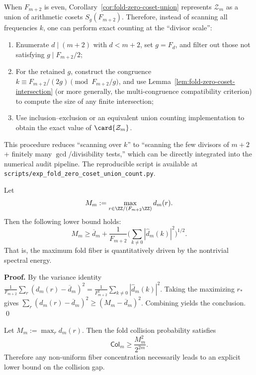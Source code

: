 \begin{remark}\label{rem:fold-zero-coset-algorithm}
When \(F_{m+2}\) is even, Corollary~\ref{cor:fold-zero-coset-union} represents \(\mathcal{Z}_m\) as a union of arithmetic cosets \(S_g(F_{m+2})\).
Therefore, instead of scanning all frequencies \(k\), one can perform exact counting at the ``divisor scale'':
\begin{enumerate}
  \item Enumerate \(d\mid(m+2)\) with \(d<m+2\), set \(g=F_d\), and filter out those not satisfying \(g\mid F_{m+2}/2\);
  \item For the retained \(g\), construct the congruence \(k\equiv F_{m+2}/(2g)\pmod{F_{m+2}/g}\), and use Lemma~\ref{lem:fold-zero-coset-intersection} (or more generally, the multi-congruence compatibility criterion) to compute the size of any finite intersection;
  \item Use inclusion--exclusion or an equivalent union counting implementation to obtain the exact value of \(\card{\mathcal{Z}_m}\).
\end{enumerate}
This procedure reduces ``scanning over \(k\)'' to ``scanning the few divisors of \(m+2\) + finitely many \(\gcd\)/divisibility tests,'' which can be directly integrated into the numerical audit pipeline.
The reproducible script is available at \texttt{scripts/exp\_fold\_zero\_coset\_union\_count.py}.
\end{remark}

\begin{theorem}
\label{thm:fold-max-fiber-spectrum}
Let
\[
M_m:=\max_{r\in\ZZ/(F_{m+2}\ZZ)} d_m(r).
\]
Then the following lower bound holds:
\[
M_m\ge \overline d_m+\frac{1}{F_{m+2}}\Biggl(\sum_{k\ne 0}|\widehat d_m(k)|^2\Biggr)^{1/2}.
\]
That is, the maximum fold fiber is quantitatively driven by the nontrivial spectral energy.
\end{theorem}

\textbf{Proof.}
By the variance identity
\(
\frac{1}{F_{m+2}}\sum_r(d_m(r)-\overline d_m)^2=\frac{1}{F_{m+2}^2}\sum_{k\ne 0}|\widehat d_m(k)|^2
\).
Taking the maximizing $r_*$ gives
\(
\sum_r(d_m(r)-\overline d_m)^2\ge (M_m-\overline d_m)^2
\).
Combining yields the conclusion. \qed

\begin{theorem}
\label{thm:fold-collision-max-fiber}
Let $M_m:=\max_r d_m(r)$. Then the fold collision probability satisfies
\[
\mathsf{Col}_m\ge \frac{M_m^2}{2^{2m}}.
\]
Therefore any non-uniform fiber concentration necessarily leads to an explicit lower bound on the collision gap.
\end{theorem}

